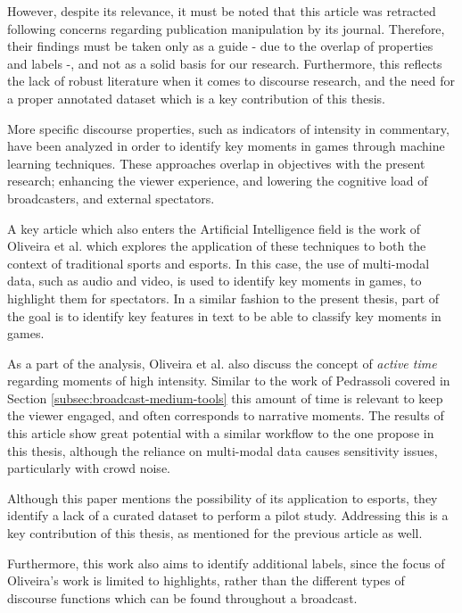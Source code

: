 However, despite its relevance, it must be noted that this article was retracted following concerns regarding publication manipulation by its journal. Therefore, their findings must be taken only as a guide - due to the overlap of properties and labels -, and not as a solid basis for our research. Furthermore, this reflects the lack of robust literature when it comes to discourse research, and the need for a proper annotated dataset which is a key contribution of this thesis. 

\medskip

More specific discourse properties, such as indicators of intensity in commentary, have been analyzed in order to identify key moments in games through machine learning techniques. These approaches overlap in objectives with the present research; enhancing the viewer experience, and lowering the cognitive load of broadcasters, and external spectators. 

\medskip 

A key article which also enters the Artificial Intelligence field is the work of Oliveira et al. \cite{oliveira2026multi} which explores the application of these techniques to both the context of traditional sports and esports. In this case, the use of multi-modal data, such as audio and video, is used to identify key moments in games, to highlight them for spectators. In a similar fashion to the present thesis, part of the goal is to identify key features in text to be able to classify key moments in games.

\medskip

As a part of the analysis, Oliveira et al. also discuss the concept of \textit{active time} regarding moments of high intensity. Similar to the work of Pedrassoli covered in Section \ref{subsec:broadcast-medium-tools} this amount of time is relevant to keep the viewer engaged, and often corresponds to narrative moments. The results of this article show great potential with a similar workflow to the one propose in this thesis, although the reliance on multi-modal data causes sensitivity issues, particularly with crowd noise.

\medskip 

Although this paper mentions the possibility of its application to esports, they identify a lack of a curated dataset to perform a pilot study. Addressing this is a key contribution of this thesis, as mentioned for the previous article as well. 

\medskip

Furthermore, this work also aims to identify additional labels, since the focus of Oliveira's work is limited to highlights, rather than the different types of discourse functions which can be found throughout a broadcast.

